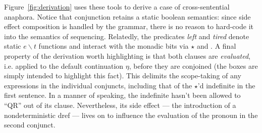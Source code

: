  Figure~\ref{fig:derivation} uses these tools to derive a case of cross-sentential anaphora. Notice that conjunction retains a static boolean semantics: since side effect composition is handled by the grammar, there is no reason to hard-code it into the semantics of sequencing. Relatedly, the predicates \emph{left} and \emph{tired} denote static $e \backslash t$ functions and interact with the monadic bits via $\star$ and . A final property of the derivation worth highlighting is that both clauses are \emph{evaluated}, i.e. applied to the default continuation $\eta$, before they are conjoined (the boxes are simply intended to highlight this fact). This delimits the scope-taking of any expressions in the individual conjuncts, including that of the $\star$'d indefinite in the first sentence. In a manner of speaking, the indefinite hasn't been allowed to ``QR'' out of its clause. Nevertheless, its side effect --- the introduction of a nondeterministic dref --- lives on to influence the evaluation of the pronoun in the second conjunct. %

